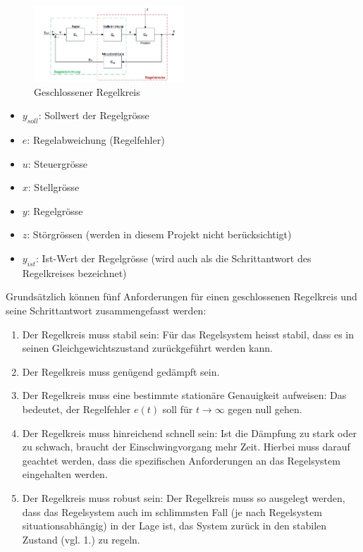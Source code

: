 \begin{figure}[!h!, width=\pagewidth]
    \centering
    \includegraphics[width=0.5\textwidth]{images/geschlRegelkreis}
    \caption{Geschlossener Regelkreis}
    \label{fig:geschlossenerRegelkreis}
\end{figure}

\begin{itemize}
    \item
        $y_{soll}$: Sollwert der Regelgr\"osse
    \item
        $e$: Regelabweichung (Regelfehler)
    \item
        $u$: Steuergr\"osse
    \item
        $x$: Stellgr\"osse
    \item
        $y$: Regelgr\"osse
    \item
        $z$: St\"orgr\"ossen (werden in diesem Projekt nicht ber\"ucksichtigt)
    \item
        $y_{ist}$: Ist-Wert  der Regelgr\"osse (wird auch  als die
        Schrittantwort des Regelkreises bezeichnet)
\end{itemize}


Grunds\"atzlich  k\"onnen  f\"unf   Anforderungen  f\"ur  einen  geschlossenen
Regelkreis und seine Schrittantwort zusammengefasst werden:
\begin{enumerate}
    \item
        Der Regelkreis muss stabil  sein: F\"ur das Regelsystem heisst stabil,
        dass es in seinen Gleichgewichtszustand zur\"uckgef\"uhrt werden kann.
    \item
        Der Regelkreis muss gen\"ugend ged\"ampft sein.
    \item
        Der   Regelkreis   muss   eine  bestimmte   station\"are   Genauigkeit
        aufweisen: Das   bedeutet,   der   Regelfehler   $e(t)$   soll   f\"ur
        $t\rightarrow\infty$ gegen null gehen.
    \item
        Der  Regelkreis  muss  hinreichend schnell  sein: Ist  die  D\"ampfung
        zu  stark   oder  zu  schwach,  braucht   der  Einschwingvorgang  mehr
        Zeit. Hierbei  muss  darauf  geachtet werden,  dass  die  spezifischen
        Anforderungen an das Regelsystem eingehalten werden.
    \item
        Der  Regelkreis muss  robust  sein: Der Regelkreis  muss so  ausgelegt
        werden,  dass  das  Regelsystem  auch im  schlimmsten  Fall  (je  nach
        Regelsystem situationsabh\"angig) in der Lage ist, das System zur\"uck
        in den stabilen Zustand (vgl. 1.) zu regeln.
\end{enumerate}


